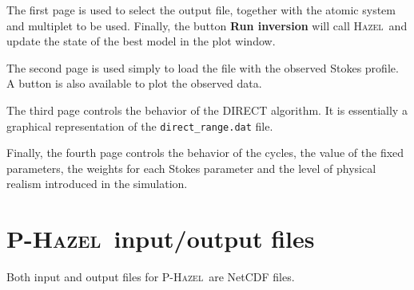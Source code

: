 \documentclass[12pt]{article}
\def\H{\textsc{Hazel}}
\def\HM{\textsc{P-Hazel}}
\begin{document}
The first page is used to select the output file, together with the 
atomic system and multiplet to be used. Finally, the button \textbf{Run inversion} will call
\H\ and update the state of the best model in the plot window.

The second page is used simply to load the file with the observed Stokes profile. A button
is also available to plot the observed data.

The third page controls the behavior of the DIRECT algorithm. It is essentially a graphical
representation of the \texttt{direct\_range.dat} file.

Finally, the fourth page controls the behavior of the cycles, the value of the fixed parameters,
the weights for each Stokes parameter and the level of physical realism introduced in the
simulation.

\section{\HM\ input/output files}
\label{sec:phazel_files}
Both input and output files for \HM\ are NetCDF files. 
\end{document}
